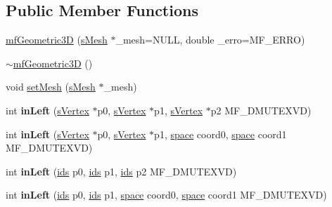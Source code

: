 \subsection*{Public Member Functions}
\begin{DoxyCompactItemize}
\item 
\hyperlink{classmf_1_1mfGeometric3D_af2db7cbaca72c5e29d9b4ed25fc92a3b}{mfGeometric3D} (\hyperlink{classmf_1_1mfGeometric3D_a4eea019f02b26eb572858d3d2f5e04f2}{sMesh} $\ast$\_\-mesh=NULL, double \_\-erro=MF\_\-ERRO)
\item 
\hyperlink{classmf_1_1mfGeometric3D_ac9a8151ba92198fc703b7e6474beed94}{$\sim$mfGeometric3D} ()
\item 
void \hyperlink{classmf_1_1mfGeometric3D_ac372b7a77d86cdf3ff56f495b7ef0d16}{setMesh} (\hyperlink{classmf_1_1mfGeometric3D_a4eea019f02b26eb572858d3d2f5e04f2}{sMesh} $\ast$\_\-mesh)
\item 
\hypertarget{classmf_1_1mfGeometric3D_a82aee3026d1c470ed45c9e8a9afef077}{
int {\bfseries inLeft} (\hyperlink{classmf_1_1mfGeometric3D_a50cf9e6bef53ef5b1e90b89c577df8e7}{sVertex} $\ast$p0, \hyperlink{classmf_1_1mfGeometric3D_a50cf9e6bef53ef5b1e90b89c577df8e7}{sVertex} $\ast$p1, \hyperlink{classmf_1_1mfGeometric3D_a50cf9e6bef53ef5b1e90b89c577df8e7}{sVertex} $\ast$p2 MF\_\-DMUTEXVD)}
\label{classmf_1_1mfGeometric3D_a82aee3026d1c470ed45c9e8a9afef077}

\item 
\hypertarget{classmf_1_1mfGeometric3D_a9a92e8444c5bb451f4127e2d1e76550e}{
int {\bfseries inLeft} (\hyperlink{classmf_1_1mfGeometric3D_a50cf9e6bef53ef5b1e90b89c577df8e7}{sVertex} $\ast$p0, \hyperlink{classmf_1_1mfGeometric3D_a50cf9e6bef53ef5b1e90b89c577df8e7}{sVertex} $\ast$p1, \hyperlink{classmf_1_1mfGeometric3D_ab732339c6fcfe15c8448a3e85409472d}{space} coord0, \hyperlink{classmf_1_1mfGeometric3D_ab732339c6fcfe15c8448a3e85409472d}{space} coord1 MF\_\-DMUTEXVD)}
\label{classmf_1_1mfGeometric3D_a9a92e8444c5bb451f4127e2d1e76550e}

\item 
\hypertarget{classmf_1_1mfGeometric3D_abfd8a4f2154851a16fa7ffffd98c34fd}{
int {\bfseries inLeft} (\hyperlink{classmf_1_1mfGeometric3D_a72458e2b6c0f4da54ce1498e93ccf7db}{ids} p0, \hyperlink{classmf_1_1mfGeometric3D_a72458e2b6c0f4da54ce1498e93ccf7db}{ids} p1, \hyperlink{classmf_1_1mfGeometric3D_a72458e2b6c0f4da54ce1498e93ccf7db}{ids} p2 MF\_\-DMUTEXVD)}
\label{classmf_1_1mfGeometric3D_abfd8a4f2154851a16fa7ffffd98c34fd}

\item 
\hypertarget{classmf_1_1mfGeometric3D_ac2acd781419f5b060ef86ee3dea3ed3f}{
int {\bfseries inLeft} (\hyperlink{classmf_1_1mfGeometric3D_a72458e2b6c0f4da54ce1498e93ccf7db}{ids} p0, \hyperlink{classmf_1_1mfGeometric3D_a72458e2b6c0f4da54ce1498e93ccf7db}{ids} p1, \hyperlink{classmf_1_1mfGeometric3D_ab732339c6fcfe15c8448a3e85409472d}{space} coord0, \hyperlink{classmf_1_1mfGeometric3D_ab732339c6fcfe15c8448a3e85409472d}{space} coord1 MF\_\-DMUTEXVD)}
\label{classmf_1_1mfGeometric3D_ac2acd781419f5b060ef86ee3dea3ed3f}


\end{DoxyCompactItemize}
